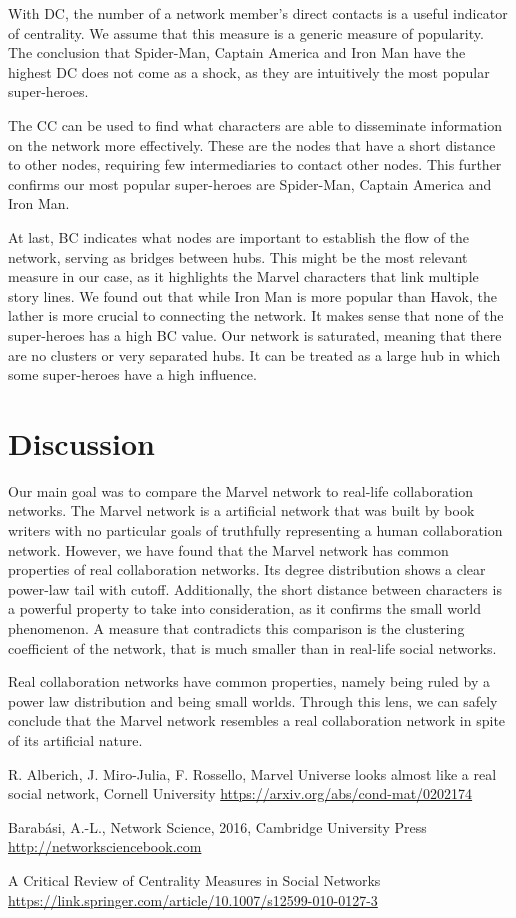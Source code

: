 \documentclass[a4paper]{article}
\begin{document}
With DC, the number of a network member’s direct contacts is a useful indicator of centrality. We assume that this measure is a generic measure of popularity. The conclusion that Spider-Man, Captain America and Iron Man have the highest DC does not come as a shock, as they are intuitively the most popular super-heroes. 

The CC can be used to find what characters are able to disseminate information on the network more effectively. These are the nodes that have a short distance to other nodes, requiring few intermediaries to contact other nodes. This further confirms our most popular super-heroes are Spider-Man, Captain America and Iron Man.

At last, BC indicates what nodes are important to establish the flow of the network, serving as bridges between hubs. This might be the most relevant measure in our case, as it highlights the Marvel characters that link multiple story lines. We found out that while Iron Man is more popular than Havok, the lather is more crucial to connecting the network. It makes sense that none of the super-heroes has a high BC value. Our network is saturated, meaning that there are no clusters or very separated hubs. It can be treated as a large hub in which some super-heroes have a high influence.

\section{Discussion}\label{disc}
Our main goal was to compare the Marvel network to real-life collaboration networks. The Marvel network is a artificial network that was built by book writers with no particular goals of truthfully representing a human collaboration network. However, we have found that the Marvel network has common properties of real collaboration networks. Its degree distribution shows a clear power-law tail with cutoff. Additionally, the short distance between characters is a powerful property to take into consideration, as it confirms the small world phenomenon. A measure that contradicts this comparison is the clustering coefficient of the network, that is much smaller than in real-life social networks\cite{cond-mat}.

Real collaboration networks have common properties, namely being ruled by a power law distribution and being small worlds. Through this lens, we can safely conclude that the Marvel network resembles a real collaboration network in spite of its artificial nature.



\begin{thebibliography}{10}
R. Alberich, J. Miro-Julia, F. Rossello, Marvel Universe looks almost like a real social network, Cornell University \url{https://arxiv.org/abs/cond-mat/0202174}

Barabási, A.-L., Network Science, 2016, Cambridge University Press \url{http://networksciencebook.com}

A Critical Review of Centrality Measures in Social Networks \url{https://link.springer.com/article/10.1007/s12599-010-0127-3}

\end{thebibliography}
\end{document}
